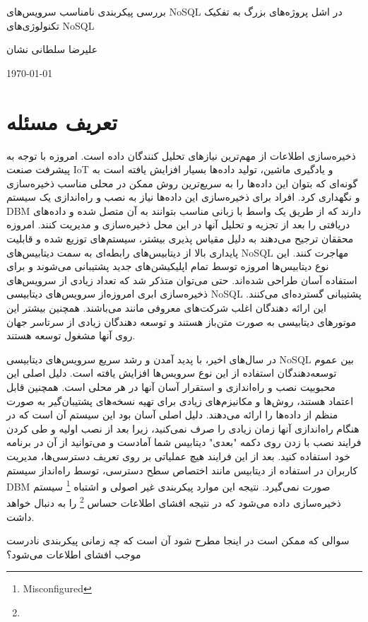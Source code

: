 \documentclass[10pt, a4paper]{article}
\begin{document}
\centerline{بررسی پیکربندی نامناسب سرویس‌های NoSQL در اشل پروژه‌های بزرگ به
تفکیک تکنولوژی‌های NoSQL}
\centerline{علیرضا سلطانی نشان}
\centerline{\today}
\tableofcontents
\section{تعریف مسئله}

ذخیره‌سازی اطلاعات از مهم‌ترین نیاز‌های تحلیل کنندگان داده است. امروزه با توجه
به پیشرفت صنعت IoT و یادگیری ماشین، تولید داده‌ها بسیار افزایش یافته است به
گونه‌ای که بتوان این داده‌ها را به سریع‌ترین روش ممکن در محلی مناسب ذخیره‌سازی و
نگهداری کرد.  افراد برای ذخیره‌سازی این داده‌ها نیاز به نصب و راه‌اندازی یک
سیستم DBM دارند که از طریق یک واسط با زبانی مناسب بتوانند به آن متصل شده و
داده‌های دریافتی را بعد از تجزیه و تحلیل آنها در این محل ذخیره‌سازی و مدیریت
کنند. امروزه محققان ترجیح می‌دهند به دلیل مقیاس پذیری بیشتر، سیستم‌های توزیع شده
و قابلیت پایداری بالا از دیتابیس‌های رابطه‌ای به سمت دیتابیس‌های NoSQL مهاجرت
کنند.  این نوع دیتابیس‌ها امروزه توسط تمام اپلیکیشن‌های جدید پشتیبانی می‌شوند و
برای استفاده آسان طراحی شده‌اند. حتی می‌توان متذکر شد که تعداد زیادی از
سرویس‌های ذخیره‌سازی ابری امروزه‌از سرویس‌های دیتابیسی NoSQL پشتیبانی گسترده‌ای
می‌کنند. این ارائه دهندگان اغلب شرکت‌های معروفی مانند 
  می‌باشند. همچنین بیشتر این
موتور‌های دیتابیسی به صورت متن‌باز هستند و توسعه دهندگان زیادی از سرتاسر جهان
روی آنها مشغول توسعه هستند.

در سال‌های اخیر، با پدید آمدن و رشد سریع سرویس‌های دیتابیسی NoSQL بین عموم
توسعه‌دهندگان استفاده از این نوع سرویس‌ها افزایش یافته است. دلیل اصلی این
محبوبیت نصب و راه‌اندازی و استقرار آسان آنها در هر محلی است. همچنین قابل اعتماد
هستند، روش‌ها و مکانیزم‌های زیادی برای تهیه نسخه‌های پشتیبان‌گیر به صورت منظم از
داده‌ها را ارائه می‌دهند. دلیل اصلی آسان بود این سیستم آن است که در هنگام
راه‌اندازی آنها زمان زیادی را صرف نمی‌کنید، زیرا بعد از نصب اولیه و طی کردن
فرایند نصب با زدن روی دکمه "بعدی" دیتابیس شما آمادست و می‌توانید از آن در برنامه
خود استفاده کنید. بعد از این فرایند هیچ عملیاتی بر روی تعریف دسترسی‌ها، مدیریت
کاربران در استفاده از دیتابیس مانند اختصاص سطح دسترسی، توسط راه‌انداز سیستم DBM
صورت نمی‌گیرد. نتیجه این موارد پیکربندی غیر اصولی و اشتباه
\footnote{Misconfigured} سیستم ذخیره‌سازی داده می‌شود که در نتیجه افشای اطلاعات
حساس \footnote{} را به دنبال خواهد داشت.

سوالی که ممکن است در اینجا مطرح شود آن است که چه زمانی پیکربندی نادرست موجب
افشای اطلاعات می‌شود؟
\end{document}
